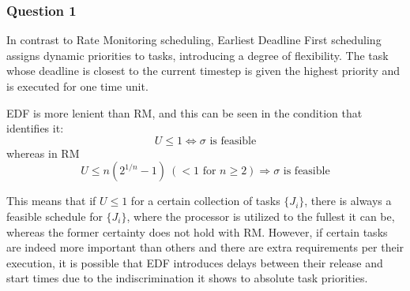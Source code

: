 \subsubsection{Question 1}

In contrast to Rate Monitoring scheduling, Earliest Deadline First scheduling
assigns dynamic priorities to tasks, introducing a degree of flexibility. The
task whose deadline is closest to the current timestep is given the highest
priority and is executed for one time unit.

EDF is more lenient than RM, and this can be seen in the condition that
identifies it:
$$U \leq 1 \Leftrightarrow \sigma \text{ is feasible}$$
whereas in RM
$$U \leq n (2^{1/n}-1)\ (< 1 \text{ for } n \geq 2) \Rightarrow \sigma \text{ is feasible}$$

This means that if $U \leq 1$ for a certain collection of tasks $\{J_i\}$,
there is always a feasible schedule for $\{J_i\}$, where the processor is
utilized to the fullest it can be, whereas the former certainty does not hold
with RM. However, if certain tasks are indeed more important than others and
there are extra requirements per their execution, it is possible that EDF
introduces delays between their release and start times due to the
indiscrimination it shows to absolute task priorities.
